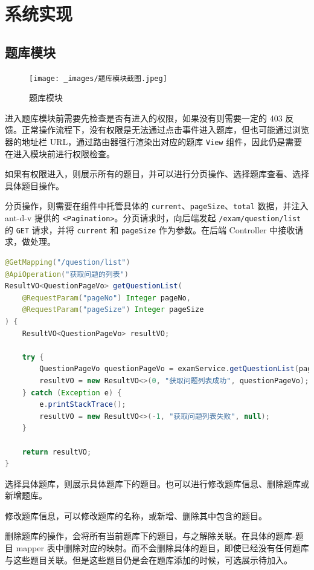 \section{系统实现}
\subsection{题库模块}
\begin{figure}[hb]
    \centering
    \texttt{[image: \_images/题库模块截图.jpeg]}
    \caption{题库模块}
\end{figure}
进入题库模块前需要先检查是否有进入的权限，如果没有则需要一定的 403 反馈。正常操作流程下，没有权限是无法通过点击事件进入题库，但也可能通过浏览器的地址栏 URL，通过路由器强行渲染出对应的题库 \lstinline!View! 组件，因此仍是需要在进入模块前进行权限检查。

如果有权限进入，则展示所有的题目，并可以进行分页操作、选择题库查看、选择具体题目操作。

分页操作，则需要在组件中托管具体的 \lstinline!current!、\lstinline!pageSize!、\lstinline!total! 数据，并注入 ant-d-v 提供的 \lstinline!<Pagination>!。分页请求时，向后端发起 \lstinline!/exam/question/list! 的 \lstinline!GET! 请求，并将 \lstinline!current! 和 \lstinline!pageSize! 作为参数。在后端 Controller 中接收请求，做处理。

\begin{lstlisting}[language=Java]
@GetMapping("/question/list")
@ApiOperation("获取问题的列表")
ResultVO<QuestionPageVo> getQuestionList(
    @RequestParam("pageNo") Integer pageNo, 
    @RequestParam("pageSize") Integer pageSize
) {
    ResultVO<QuestionPageVo> resultVO;
    
    try {
        QuestionPageVo questionPageVo = examService.getQuestionList(pageNo, pageSize);
        resultVO = new ResultVO<>(0, "获取问题列表成功", questionPageVo);
    } catch (Exception e) {
        e.printStackTrace();
        resultVO = new ResultVO<>(-1, "获取问题列表失败", null);
    }
    
    return resultVO;
}
\end{lstlisting}

选择具体题库，则展示具体题库下的题目。也可以进行修改题库信息、删除题库或新增题库。

修改题库信息，可以修改题库的名称，或新增、删除其中包含的题目。

删除题库的操作，会将所有当前题库下的题目，与之解除关联。在具体的题库-题目 mapper 表中删除对应的映射。而不会删除具体的题目，即使已经没有任何题库与这些题目关联。但是这些题目仍是会在题库添加的时候，可选展示待加入。

